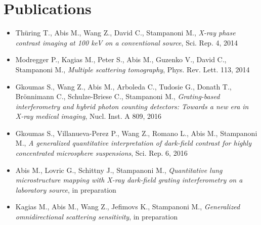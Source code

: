 \chapter*{Publications}
\begin{itemize}
    \item Th\"uring T., Abis M., Wang Z., David C., Stampanoni M.,
        \emph{X-ray phase contrast imaging at 100 keV on a conventional
        source}, Sci. Rep. 4, 2014
    \item Modregger P., Kagias M., Peter S., Abis M., Guzenko V., David C.,
        Stampanoni M., \emph{Multiple scattering tomography}, Phys. Rev.
        Lett. 113, 2014
    \item Gkoumas S., Wang Z., Abis M., Arboleda C., Tudosie G., Donath T.,
        Br\"onnimann C., Schulze-Briese C., Stampanoni M.,
        \emph{Grating-based interferometry and hybrid photon counting
        detectors: Towards a new era in X-ray medical imaging}, Nucl. Inst.
        A 809, 2016
    \item Gkoumas S., Villanueva-Perez P., Wang Z., Romano L., Abis M.,
        Stampanoni M., \emph{A generalized quantitative interpretation of
        dark-field contrast for highly concentrated microsphere
    suspensions}, Sci. Rep. 6, 2016
    \item Abis M., Lovric G., Schittny J., Stampanoni
    M., \emph{Quantitative lung microstructure mapping with X-ray dark-field
    grating interferometry on a laboratory source}, in preparation
    \item Kagias M., Abis M., Wang Z., Jefimovs K., Stampanoni M.,
        \emph{Generalized omnidirectional scattering sensitivity}, in
        preparation
\end{itemize}
